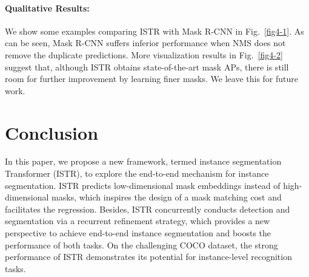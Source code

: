 \documentclass[10pt,twocolumn,letterpaper]{article}
\begin{document}
\paragraph{Qualitative Results:} We show some examples comparing ISTR with Mask R-CNN in Fig.~\ref{fig4-1}.
As can be seen, Mask R-CNN suffers inferior performance when NMS does not remove the duplicate predictions.
More visualization results in Fig.~\ref{fig4-2} suggest that, although ISTR obtains state-of-the-art mask APs, there is still room for further improvement by learning finer masks.
We leave this for future work.

\section{Conclusion}
In this paper, we propose a new framework, termed instance segmentation Transformer (ISTR), to explore the end-to-end mechanism for instance segmentation.
ISTR predicts low-dimensional mask embeddings instead of high-dimensional masks, which inspires the design of a mask matching cost and facilitates the regression.
Besides, ISTR concurrently conducts detection and segmentation via a recurrent refinement strategy, which provides a new perspective to achieve end-to-end instance segmentation and boosts the performance of both tasks.
On the challenging COCO dataset, the strong performance of ISTR demonstrates its potential for instance-level recognition tasks.


{\small


}
\end{document}
